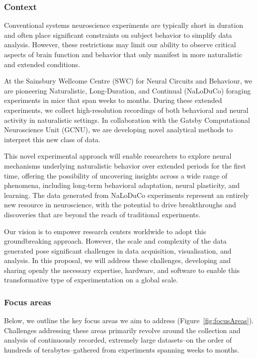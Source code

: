 \subsubsection{Context}

Conventional systems neuroscience experiments are typically short in duration
and often place significant constraints on subject behavior to simplify data
analysis.
%
However, these restrictions may limit our ability to observe critical
aspects of brain function and behavior that only manifest in more naturalistic
and extended conditions.

At the Sainsbury Wellcome Centre (SWC) for Neural Circuits and Behaviour, we
are pioneering Naturalistic, Long-Duration, and Continual (NaLoDuCo) foraging
experiments in mice that span weeks to months. During these extended
experiments, we collect high-resolution recordings of both behavioral and
neural activity in naturalistic settings. In collaboration with the Gatsby
Computational Neuroscience Unit (GCNU), we are developing novel analytical
methods to interpret this new class of data.

This novel experimental approach will enable researchers to explore neural
mechanisms underlying naturalistic behavior over extended periods for the first
time, offering the possibility of uncovering insights across a wide range of
phenomena, including long-term behavioral adaptation, neural plasticity, and
learning.
%
The data generated from NaLoDuCo experiments represent an entirely new resource
in neuroscience, with the potential to drive breakthroughs and discoveries that
are beyond the reach of traditional experiments.

Our vision is to empower research centers worldwide to adopt this
groundbreaking approach.
%
However, the scale and complexity of the data generated pose significant
challenges in data acquisition, visualisation, and analysis.
%
In this proposal, we will address these challenges, developing and sharing
openly the necessary expertise, hardware, and software to enable this
transformative type of experimentation on a global scale.

\subsubsection{Focus areas}

Below, we outline the key focus areas we aim to address
(Figure~\ref{fig:focusAreas}).
%
Challenges addressing these areas primarily revolve around the collection
and analysis of continuously recorded, extremely large datasets--on the order
of hundreds of terabytes--gathered from experiments spanning weeks to months.

